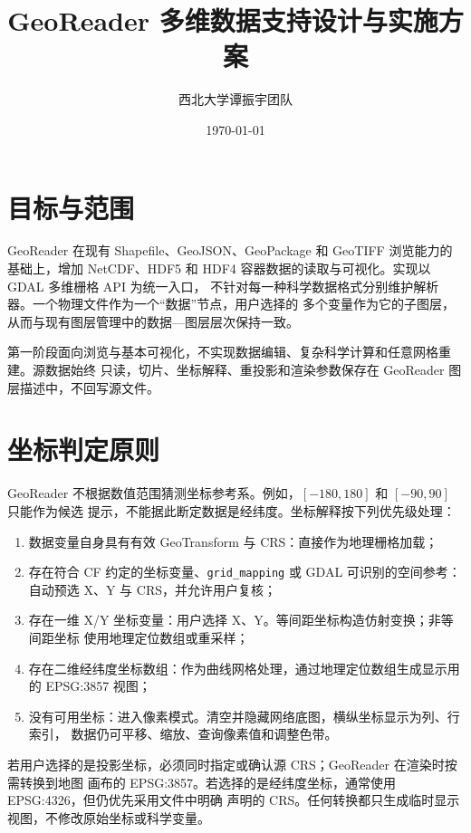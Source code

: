 \documentclass[UTF8,fontset=fandol,11pt]{ctexart}
\title{GeoReader 多维数据支持设计与实施方案}
\author{西北大学谭振宇团队}
\date{\today}
\begin{document}
\maketitle

\section{目标与范围}

GeoReader 在现有 Shapefile、GeoJSON、GeoPackage 和 GeoTIFF 浏览能力的基础上，增加
NetCDF、HDF5 和 HDF4 容器数据的读取与可视化。实现以 GDAL 多维栅格 API 为统一入口，
不针对每一种科学数据格式分别维护解析器。一个物理文件作为一个“数据”节点，用户选择的
多个变量作为它的子图层，从而与现有图层管理中的数据---图层层次保持一致。

第一阶段面向浏览与基本可视化，不实现数据编辑、复杂科学计算和任意网格重建。源数据始终
只读，切片、坐标解释、重投影和渲染参数保存在 GeoReader 图层描述中，不回写源文件。

\section{坐标判定原则}

GeoReader 不根据数值范围猜测坐标参考系。例如，$[-180,180]$ 和 $[-90,90]$ 只能作为候选
提示，不能据此断定数据是经纬度。坐标解释按下列优先级处理：

\begin{enumerate}
  \item 数据变量自身具有有效 GeoTransform 与 CRS：直接作为地理栅格加载；
  \item 存在符合 CF 约定的坐标变量、\texttt{grid\_mapping} 或 GDAL 可识别的空间参考：
        自动预选 X、Y 与 CRS，并允许用户复核；
  \item 存在一维 X/Y 坐标变量：用户选择 X、Y。等间距坐标构造仿射变换；非等间距坐标
        使用地理定位数组或重采样；
  \item 存在二维经纬度坐标数组：作为曲线网格处理，通过地理定位数组生成显示用的
        EPSG:3857 视图；
  \item 没有可用坐标：进入像素模式。清空并隐藏网络底图，横纵坐标显示为列、行索引，
        数据仍可平移、缩放、查询像素值和调整色带。
\end{enumerate}

若用户选择的是投影坐标，必须同时指定或确认源 CRS；GeoReader 在渲染时按需转换到地图
画布的 EPSG:3857。若选择的是经纬度坐标，通常使用 EPSG:4326，但仍优先采用文件中明确
声明的 CRS。任何转换都只生成临时显示视图，不修改原始坐标或科学变量。
\end{document}
